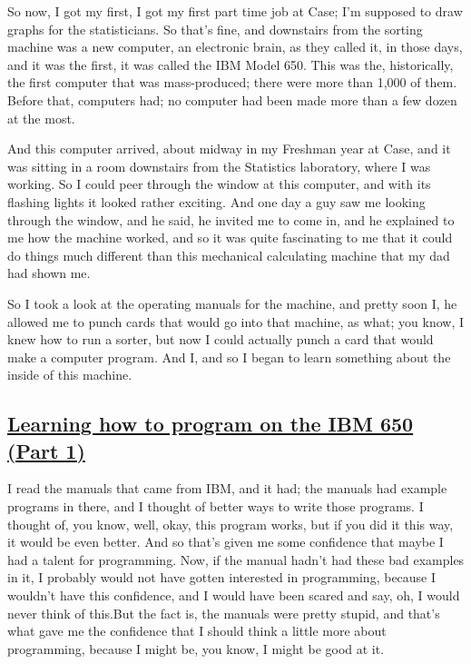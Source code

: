 \documentclass[]{article}
\begin{document}
So now, I got my first, I got my first part time job at Case; I'm
supposed to draw graphs for the statisticians. So that's fine, and
downstairs from the sorting machine was a new computer, an electronic
brain, as they called it, in those days, and it was the first, it was
called the IBM Model 650. This was the, historically, the first computer
that was mass-produced; there were more than 1,000 of them. Before that,
computers had; no computer had been made more than a few dozen at the
most.

And this computer arrived, about midway in my Freshman year at Case, and
it was sitting in a room downstairs from the Statistics laboratory,
where I was working. So I could peer through the window at this
computer, and with its flashing lights it looked rather exciting. And
one day a guy saw me looking through the window, and he said, he invited
me to come in, and he explained to me how the machine worked, and so it
was quite fascinating to me that it could do things much different than
this mechanical calculating machine that my dad had shown me.

So I took a look at the operating manuals for the machine, and pretty
soon I, he allowed me to punch cards that would go into that machine, as
what; you know, I knew how to run a sorter, but now I could actually
punch a card that would make a computer program. And I, and so I began
to learn something about the inside of this machine.

\subsection{\texorpdfstring{\href{http://webofstories.com/play/17079}{Learning
how to program on the IBM 650 (Part
1)}}{Learning how to program on the IBM 650 (Part 1)}}\label{learning-how-to-program-on-the-ibm-650-part-1}

I read the manuals that came from IBM, and it had; the manuals had
example programs in there, and I thought of better ways to write those
programs. I thought of, you know, well, okay, this program works, but if
you did it this way, it would be even better. And so that's given me
some confidence that maybe I had a talent for programming. Now, if the
manual hadn't had these bad examples in it, I probably would not have
gotten interested in programming, because I wouldn't have this
confidence, and I would have been scared and say, oh, I would never
think of this.But the fact is, the manuals were pretty stupid, and
that's what gave me the confidence that I should think a little more
about programming, because I might be, you know, I might be good at it.
\end{document}
